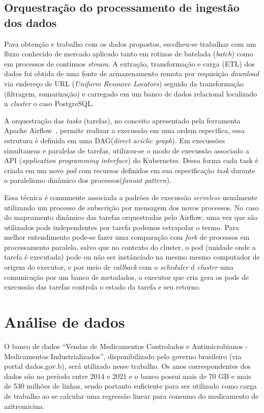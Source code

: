 \subsection{Orquestração do processamento de ingestão dos dados}

Para obtenção e trabalho com os dados propostos, escolheu-se trabalhar com um fluxo conhecido de mercado aplicado tanto em rotinas de batelada (\emph{batch}) como em processos de continuos \emph{stream}. A extração, transformação e carga (ETL) dos dados foi obtida de uma fonte de armazenamento remota por requisição \emph{download} via endereço de URL (\emph{Uniform Resource Locators}) seguido da transformação (filtragem, sumarização) e carregado em um banco de dados relacional localizado n \emph{cluster} o caso PostgreSQL\textregistered.

A orquestração das \emph{tasks} (tarefas), no conceito apresentado pela ferramenta {Apache Airflow}\textregistered \ \cite{airflowconcepts}, permite realizar a execussão em uma ordem especifica, essa estrutura é definida em uma DAG(\emph{direct aciclic graph}). Em execussões simultaneas e paralelas de tarefas, utilizou-se o modo de execussão associado a API (\emph{application programming interface}) do Kubernetes\textregistered. Dessa forma cada task é criada em um novo \emph{pod} com recursos definidos em sua especificação \emph{task} durante o paralelismo dinâmico dos processos(\emph{fanout pattern}).

Essa técnica é comumente associada a padrões de execussão \emph{serveless} usualmente utilizando um processo de subscrição por mensagem dos novos processos. No caso do mapeamento dinâmico das tarefas orquestradas pelo Airflow, uma vez que são utilizados pods independentes por tarefa podemos estrapolar o termo. Para melhor entendimento pode-se fazer uma comparação com \emph{fork} de processos em processamento paralelo, salvo que no contexto do cluster, o pod (unidade onde a tarefa é executada) pode ou não ser instânciado na mesmo mesmo computador de origem do executor, e por meio de \emph{callback} com o \emph{scheduler} d \emph{cluster}  uma comunicação por um banco de metadados, o executor que cria gera os pods de execussão das tarefas controla o estado da tarefa e seu retorno.

\section{Análise de dados}

O banco de dados “Vendas de Medicamentos Controlados e Antimicrobianos - Medicamentos Industrializados”, disponibilizado pelo governo brasileiro (via portal dados.gov.b), será utilizado nesse trabalho. Os anos correspondentes dos dados são no período entre 2014 e 2021 e o banco possui mais de 70 GB  e mais de 530 milhões de linhas, sendo portanto suficiente para ser utilizado como carga de trabalho ao se calcular uma regressão linear para consumo do medicamento de azitromicina.

